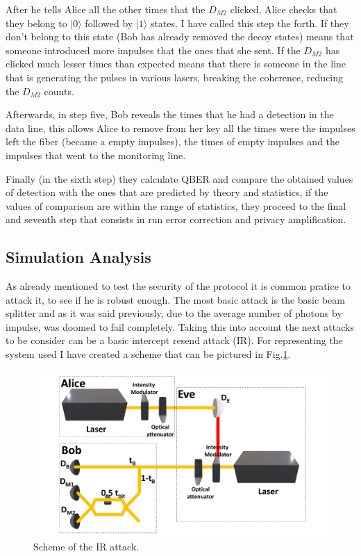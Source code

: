 \begin{refsection}
After he tells Alice all the other times that the $D_{M2}$ clicked, Alice checks that they belong to $|0\rangle$ followed by $|1\rangle$ states. I have called this step the forth. If they don't belong to this state (Bob has already removed the decoy states) means that someone introduced more impulses that the ones that she sent. If the $D_{M2}$ has clicked much lesser times than expected means that there is someone in the line that is generating the pulses in various lasers, breaking the coherence, reducing the $D_{M2}$ counts.

Afterwards, in step five, Bob reveals the times that he had a detection in the data line, this allows Alice to remove from her key all the times were the impulses left the fiber (became a empty impulses), the times of empty impulses and the impulses that went to the monitoring line.

Finally (in the sixth step) they calculate QBER and compare the obtained values of detection with the ones that are predicted by theory and statistics, if the values of comparison are within the range of statistics, they proceed to the final and seventh step that consists in run error correction and privacy amplification.

\subsection{Simulation Analysis}

As already mentioned to test the security of the protocol it is common pratice to attack it, to see if he is robust enough. The most basic attack is the basic beam splitter and as it was said previously, due to the average number of photons by impulse, was doomed to fail completely. Taking this into account the next attacks to be consider can be a basic intercept resend attack (IR). For representing the system used I have created a scheme that can be pictured in Fig.\ref{fig:E}.

\begin{figure}[h]
\centering
\includegraphics[width=1\linewidth]{./sdf/tq_76558_cow_protocol/slides/figures/E.pdf}
\caption{Scheme of the IR attack.}
\label{fig:E}
\end{figure}


\end{refsection}
